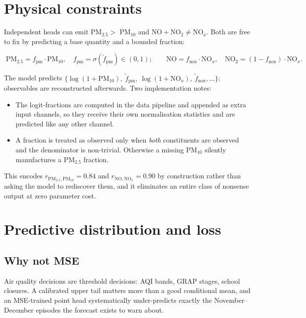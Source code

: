 \documentclass[11pt,a4paper]{article}
\begin{document}
\section{Physical constraints}

Independent heads can emit PM$_{2.5}>$ PM$_{10}$ and $\text{NO}+\text{NO}_2\neq\text{NO}_x$.
Both are free to fix by predicting a base quantity and a bounded fraction:

\begin{equation}
\boxed{\;
\text{PM}_{2.5} = f_{\text{pm}}\cdot \text{PM}_{10},\quad f_{\text{pm}}=\sigma(\tilde f_{\text{pm}})\in(0,1);
\qquad
\text{NO} = f_{\text{nox}}\cdot\text{NO}_x,\quad \text{NO}_2=(1-f_{\text{nox}})\cdot \text{NO}_x. \;}
\end{equation}

The model predicts $\{\log(1+\text{PM}_{10}),\ \tilde f_{\text{pm}},\ \log(1+\text{NO}_x),\ \tilde f_{\text{nox}},\dots\}$;
observables are reconstructed afterwards. Two implementation notes:

\begin{itemize}[leftmargin=1.4em]
\item The logit-fractions are computed in the data pipeline and appended as
extra input channels, so they receive their own normalisation statistics and are
predicted like any other channel.
\item A fraction is treated as observed only when \emph{both} constituents are
observed and the denominator is non-trivial. Otherwise a missing PM$_{10}$
silently manufactures a PM$_{2.5}$ fraction.
\end{itemize}

This encodes $r_{\text{PM}_{2.5},\text{PM}_{10}}=0.84$ and $r_{\text{NO},\text{NO}_x}=0.90$
by construction rather than asking the model to rediscover them, and it
eliminates an entire class of nonsense output at zero parameter cost.

\section{Predictive distribution and loss}

\subsection{Why not MSE}

Air quality decisions are threshold decisions: AQI bands, GRAP stages, school
closures. A calibrated upper tail matters more than a good conditional mean, and
an MSE-trained point head systematically under-predicts exactly the
November--December episodes the forecast exists to warn about.
\end{document}
